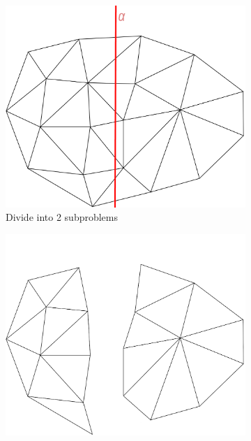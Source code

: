 \begin{figure}[H]
     \centering
     \begin{subfigure}[b]{0.3\textwidth}
         \centering
         \includegraphics[width=\textwidth]{01NaiveCut.png}
         \caption{Divide into 2 subproblems}
         \label{fig:y equals x}
     \end{subfigure}
     \hfill
     \begin{subfigure}[b]{0.3\textwidth}
         \centering
         \includegraphics[width=\textwidth]{02NaiveSub.png}

\end{subfigure}
\end{figure}
